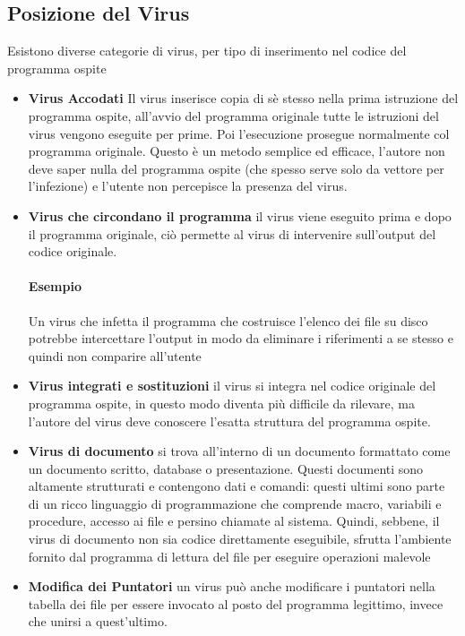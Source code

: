 \subsection{Posizione del Virus}
Esistono diverse categorie di virus, per tipo di inserimento nel codice del programma ospite
\begin{itemize}
\item \textbf{Virus Accodati} Il virus inserisce copia di sè stesso nella prima istruzione del programma ospite, all'avvio del programma originale tutte le istruzioni del virus vengono eseguite per prime. Poi l'esecuzione prosegue normalmente col programma originale. Questo è un metodo semplice ed efficace, l'autore non deve saper nulla del programma ospite (che spesso serve solo da vettore per l'infezione) e l'utente non percepisce la presenza del virus.
\item \textbf{Virus che circondano il programma} il virus viene eseguito prima e dopo il programma originale, ciò permette al virus di intervenire sull'output del codice originale.
\paragraph{Esempio} Un virus che infetta il programma che costruisce l'elenco dei file su disco potrebbe intercettare l'output in modo da eliminare i riferimenti a se stesso e quindi non comparire all'utente
\item \textbf{Virus integrati e sostituzioni} il virus si integra nel codice originale del programma ospite, in questo modo diventa più difficile da rilevare, ma l'autore del virus deve conoscere l'esatta struttura del programma ospite.
\item \textbf{Virus di documento} si trova all'interno di un documento formattato come un documento scritto, database o presentazione. Questi documenti sono altamente strutturati e contengono dati e comandi: questi ultimi sono parte di un ricco linguaggio di programmazione che comprende macro, variabili e procedure, accesso ai file e persino chiamate al sistema. Quindi, sebbene, il virus di documento non sia codice direttamente eseguibile, sfrutta l'ambiente fornito dal programma di lettura del file per eseguire operazioni malevole
\item \textbf{Modifica dei Puntatori} un virus può anche modificare i puntatori nella tabella dei file per essere invocato al posto del programma legittimo, invece che unirsi a quest'ultimo.
\end{itemize}

